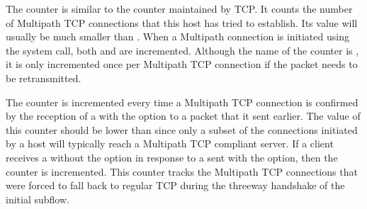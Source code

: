 \documentclass[letterpaper,10pt,english]{sphinxmanual}
\begin{document}
\sphinxAtStartPar
The  counter is similar to the 
counter maintained by TCP. It counts the number of Multipath TCP connections
that this host has tried to establish. Its value will usually be much smaller than . When a Multipath connection is initiated using the
 system call, both  and
 are incremented. Although the name of the counter is
, it is only incremented once per Multipath
TCP connection if the  packet needs to be retransmitted.

\sphinxAtStartPar
The  counter is incremented every time
a Multipath TCP connection is confirmed by the reception of a
 with the  option to a  packet
that it sent earlier. The value of this counter should be lower than
 since only a subset of the connections initiated
by a host will typically reach a Multipath TCP compliant server.
If a client receives a  without the  option
in response to a  sent with the  option, then
the  counter is incremented. This
counter tracks the Multipath TCP connections that were forced to fall back
to regular TCP during the three\sphinxhyphen{}way handshake of the initial subflow.
\end{document}
